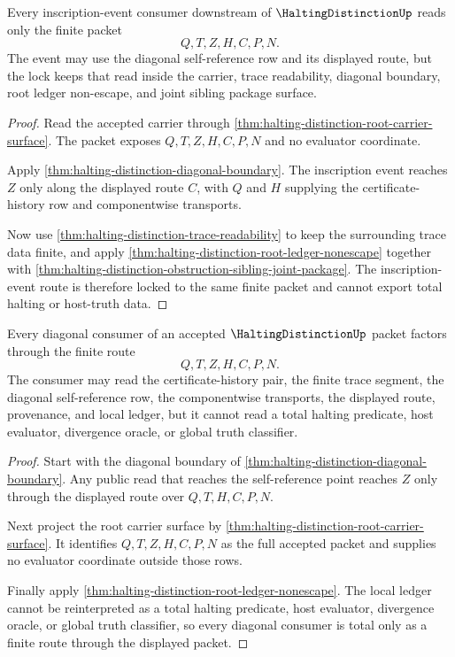 \begin{theorem}
\label{thm:halting-distinction-root-inscription-event-lock}
Every inscription-event consumer downstream of $\HaltingDistinctionUp$ reads only the finite packet
$$
Q,T,Z,H,C,P,N.
$$
The event may use the diagonal self-reference row and its displayed route, but the lock keeps that read inside the carrier, trace readability, diagonal boundary, root ledger non-escape, and joint sibling package surface.
\end{theorem}
\begin{proof}
Read the accepted carrier through \autoref{thm:halting-distinction-root-carrier-surface}. The packet exposes $Q,T,Z,H,C,P,N$ and no evaluator coordinate.

Apply \autoref{thm:halting-distinction-diagonal-boundary}. The inscription event reaches $Z$ only along the displayed route $C$, with $Q$ and $H$ supplying the certificate-history row and componentwise transports.

Now use \autoref{thm:halting-distinction-trace-readability} to keep the surrounding trace data finite, and apply \autoref{thm:halting-distinction-root-ledger-nonescape} together with \autoref{thm:halting-distinction-obstruction-sibling-joint-package}. The inscription-event route is therefore locked to the same finite packet and cannot export total halting or host-truth data.
\end{proof}

\begin{theorem}
\label{thm:halting-distinction-root-diagonal-route-totality}
Every diagonal consumer of an accepted $\HaltingDistinctionUp$ packet factors through the finite route
$$
Q,T,Z,H,C,P,N.
$$
The consumer may read the certificate-history pair, the finite trace segment, the diagonal self-reference row, the componentwise transports, the displayed route, provenance, and local ledger, but it cannot read a total halting predicate, host evaluator, divergence oracle, or global truth classifier.
\end{theorem}
\begin{proof}
Start with the diagonal boundary of \autoref{thm:halting-distinction-diagonal-boundary}. Any public read that reaches the self-reference point reaches $Z$ only through the displayed route over $Q,T,H,C,P,N$.

Next project the root carrier surface by \autoref{thm:halting-distinction-root-carrier-surface}. It identifies $Q,T,Z,H,C,P,N$ as the full accepted packet and supplies no evaluator coordinate outside those rows.

Finally apply \autoref{thm:halting-distinction-root-ledger-nonescape}. The local ledger cannot be reinterpreted as a total halting predicate, host evaluator, divergence oracle, or global truth classifier, so every diagonal consumer is total only as a finite route through the displayed packet.
\end{proof}

